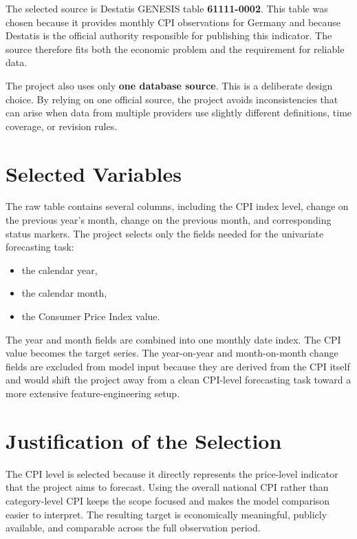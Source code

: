 The selected source is Destatis GENESIS table \textbf{61111-0002}. This table was chosen because it provides monthly CPI observations for Germany and because Destatis is the official authority responsible for publishing this indicator. The source therefore fits both the economic problem and the requirement for reliable data.

The project also uses only \textbf{one database source}. This is a deliberate design choice. By relying on one official source, the project avoids inconsistencies that can arise when data from multiple providers use slightly different definitions, time coverage, or revision rules.

\section{Selected Variables}

The raw table contains several columns, including the CPI index level, change on the previous year's month, change on the previous month, and corresponding status markers. The project selects only the fields needed for the univariate forecasting task:

\begin{itemize}
	\item the calendar year,
	\item the calendar month,
	\item the Consumer Price Index value.
\end{itemize}

The year and month fields are combined into one monthly date index. The CPI value becomes the target series. The year-on-year and month-on-month change fields are excluded from model input because they are derived from the CPI itself and would shift the project away from a clean CPI-level forecasting task toward a more extensive feature-engineering setup.

\section{Justification of the Selection}

The CPI level is selected because it directly represents the price-level indicator that the project aims to forecast. Using the overall national CPI rather than category-level CPI keeps the scope focused and makes the model comparison easier to interpret. The resulting target is economically meaningful, publicly available, and comparable across the full observation period.

